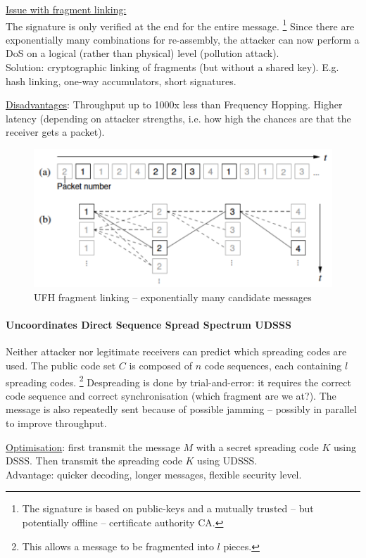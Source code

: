 \underline{Issue with fragment linking:} \\
The signature is only verified at the end for the entire message.%
\footnote{The signature is based on public-keys and a mutually trusted -- but potentially offline -- certificate authority CA.}
Since there are exponentially many combinations for re-assembly, the attacker can now perform a DoS on a logical (rather than physical) level (pollution attack).
\\
Solution: cryptographic linking of fragments (but without a shared key).
E.g. hash linking, one-way accumulators, short signatures.

\underline{Disadvantages}:
Throughput up to 1000x less than Frequency Hopping.
Higher latency (depending on attacker strengths, i.e. how high the chances are that the receiver gets a packet).

\begin{figure}
	\centering
	\includegraphics[scale=0.4]{images/3-ufh-fragment-linking.png}
	\caption{UFH fragment linking -- exponentially many candidate messages}
	\label{fig:ufh-fragment-linking}
\end{figure}

\paragraph{Uncoordinates Direct Sequence Spread Spectrum UDSSS}
Neither attacker nor legitimate receivers can predict which spreading codes are used.
The public code set $C$ is composed of $n$ code sequences, each containing $l$ spreading codes.%
\footnote{This allows a message to be fragmented into $l$ pieces.}
Despreading is done by trial-and-error: it requires the correct code sequence and correct synchronisation (which fragment are we at?).
The message is also repeatedly sent because of possible jamming -- possibly in parallel to improve throughput.

\underline{Optimisation}: first transmit the message $M$ with a secret spreading code $K$ using DSSS.
Then transmit the spreading code $K$ using UDSSS.
\\
Advantage: quicker decoding, longer messages, flexible security level.


